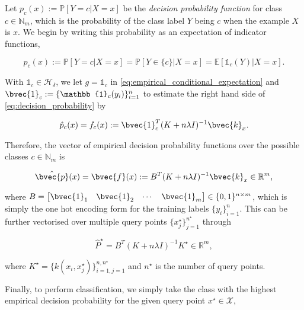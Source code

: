 \documentclass{article}
\begin{document}
	Let $p_{c}(x) := \mathbb{P}[Y = c | X = x]$ be the \textit{decision probability function} for class $c \in \mathbb{N}_{m}$, which is the probability of the class label $Y$ being $c$ when the example $X$ is $x$. We begin by writing this probability as an expectation of indicator functions,
	
	\begin{equation}
		p_{c}(x) := \mathbb{P}[Y = c | X = x] = \mathbb{P}[Y \in \{c\} | X = x] = \mathbb{E}[\mathbb{1}_{c}(Y) | X = x].
	\label{eq:decision_probability}
	\end{equation}	
	
	With $\mathbb{1}_{c} \in \mathcal{H}_{\delta}$, we let $g = \mathbb{1}_{c}$ in \eqref{eq:empirical_conditional_expectation} and $\bvec{1}_{c} := \{\mathbb{1}_{c}(y_{i})\}_{i = 1}^{n}$ to estimate the right hand side of \eqref{eq:decision_probability} by
	
	\begin{equation}
		\hat{p}_{c}(x) = f_{c}(x) := \bvec{1}_{c}^{T} (K + n \lambda I)^{-1} \bvec{k}_{x}.
	\label{eq:empirical_decision_probability}
	\end{equation}
	
	Therefore, the vector of empirical decision probability functions over the possible classes $c \in \mathbb{N}_{m}$ is
	
	\begin{equation}
		\hat{\bvec{p}}(x) = \bvec{f}(x) := B^{T} (K + n \lambda I)^{-1} \bvec{k}_{x} \in \mathbb{R}^{m},
	\label{eq:empirical_decision_probability_vector}
	\end{equation}
	
	where $B = \begin{bmatrix} \bvec{1}_{1} & \bvec{1}_{2} & \cdots & \bvec{1}_{m} \end{bmatrix} \in \{0, 1\}^{n \times m}$, which is simply the one hot encoding form for the training labels $\{y_{i}\}_{i = 1}^{n}$. This can be further vectorised over multiple query points $\{x^{\star}_{j}\}_{j = 1}^{n^{\star}}$ through
	
	\begin{equation}
		\hat{P}^{\star} = B^{T} (K + n \lambda I)^{-1} K^{\star} \in \mathbb{R}^{m},
	\label{eq:empirical_decision_probability_matrix}
	\end{equation}
	
	where $K^{\star} = \{k(x_{i}, x_{j}^{\star})\}_{i = 1, j = 1}^{n, n^{\star}}$ and $n^{\star}$ is the number of query points.
	
	Finally, to perform classification, we simply take the class with the highest empirical decision probability for the given query point $x^{\star} \in \mathcal{X}$,
	
\end{document}
